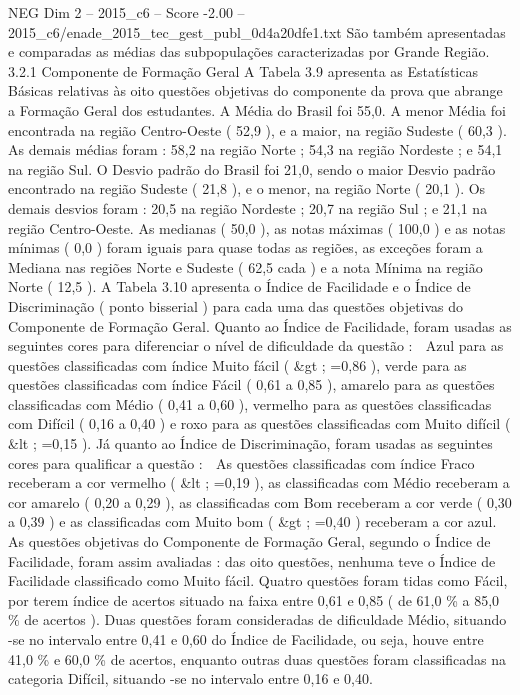 \begin{textsample}{NEG Dim 2 – 2015\_c6 – Score -2.00 – 2015\_c6/enade\_2015\_tec\_gest\_publ\_0d4a20dfe1.txt}
São também apresentadas e comparadas as médias das subpopulações caracterizadas por Grande Região. 3.2.1 Componente de Formação Geral A Tabela 3.9 apresenta as Estatísticas Básicas relativas às oito questões objetivas do componente da prova que abrange a Formação Geral dos estudantes.
A Média do Brasil foi 55,0.
A menor Média foi encontrada na região Centro-Oeste ( 52,9 ), e a maior, na região Sudeste ( 60,3 ).
As demais médias foram : 58,2 na região Norte ; 54,3 na região Nordeste ; e 54,1 na região Sul.
O Desvio padrão do Brasil foi 21,0, sendo o maior Desvio padrão encontrado na região Sudeste ( 21,8 ), e o menor, na região Norte ( 20,1 ).
Os demais desvios foram : 20,5 na região Nordeste ; 20,7 na região Sul ; e 21,1 na região Centro-Oeste.
As medianas ( 50,0 ), as notas máximas ( 100,0 ) e as notas mínimas ( 0,0 ) foram iguais para quase todas as regiões, as exceções foram a Mediana nas regiões Norte e Sudeste ( 62,5 cada ) e a nota Mínima na região Norte ( 12,5 ).
A Tabela 3.10 apresenta o Índice de Facilidade e o Índice de Discriminação ( ponto bisserial ) para cada uma das questões objetivas do Componente de Formação Geral.
Quanto ao Índice de Facilidade, foram usadas as seguintes cores para diferenciar o nível de dificuldade da questão :  Azul para as questões classificadas com índice Muito fácil ( \&gt ; =0,86 ), verde para as questões classificadas com índice Fácil ( 0,61 a 0,85 ), amarelo para as questões classificadas com Médio ( 0,41 a 0,60 ), vermelho para as questões classificadas com Difícil ( 0,16 a 0,40 ) e roxo para as questões classificadas com Muito difícil ( \&lt ; =0,15 ).
Já quanto ao Índice de Discriminação, foram usadas as seguintes cores para qualificar a questão :  As questões classificadas com índice Fraco receberam a cor vermelho ( \&lt ; =0,19 ), as classificadas com Médio receberam a cor amarelo ( 0,20 a 0,29 ), as classificadas com Bom receberam a cor verde ( 0,30 a 0,39 ) e as classificadas com Muito bom ( \&gt ; =0,40 ) receberam a cor azul.
As questões objetivas do Componente de Formação Geral, segundo o Índice de Facilidade, foram assim avaliadas : das oito questões, nenhuma teve o Índice de Facilidade classificado como Muito fácil.
Quatro questões foram tidas como Fácil, por terem índice de acertos situado na faixa entre 0,61 e 0,85 ( de 61,0 \% a 85,0 \% de acertos ).
Duas questões foram consideradas de dificuldade Médio, situando -se no intervalo entre 0,41 e 0,60 do Índice de Facilidade, ou seja, houve entre 41,0 \% e 60,0 \% de acertos, enquanto outras duas questões foram classificadas na categoria Difícil, situando -se no intervalo entre 0,16 e 0,40.

\end{textsample}
